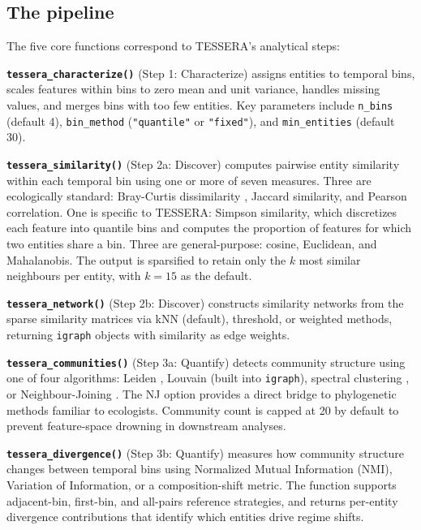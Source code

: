 \documentclass[12pt]{article}
\begin{document}
\subsection{The pipeline}

The five core functions correspond to TESSERA's analytical steps:

\textbf{\texttt{tessera\_characterize()}} (Step 1: Characterize) assigns entities to temporal bins, scales features within bins to zero mean and unit variance, handles missing values, and merges bins with too few entities. Key parameters include \texttt{n\_bins} (default 4), \texttt{bin\_method} (\texttt{"quantile"} or \texttt{"fixed"}), and \texttt{min\_entities} (default 30).

\textbf{\texttt{tessera\_similarity()}} (Step 2a: Discover) computes pairwise entity similarity within each temporal bin using one or more of seven measures. Three are ecologically standard: Bray-Curtis dissimilarity \citep[via \texttt{vegan};][]{Oksanen2022}, Jaccard similarity, and Pearson correlation. One is specific to TESSERA: Simpson similarity, which discretizes each feature into quantile bins and computes the proportion of features for which two entities share a bin. Three are general-purpose: cosine, Euclidean, and Mahalanobis. The output is sparsified to retain only the $k$ most similar neighbours per entity, with $k=15$ as the default.

\textbf{\texttt{tessera\_network()}} (Step 2b: Discover) constructs similarity networks from the sparse similarity matrices via kNN (default), threshold, or weighted methods, returning \texttt{igraph} objects \citep{Csardi2006} with similarity as edge weights.

\textbf{\texttt{tessera\_communities()}} (Step 3a: Quantify) detects community structure using one of four algorithms: Leiden \citep[via the \texttt{leiden} package;][]{Traag2019}, Louvain (built into \texttt{igraph}), spectral clustering \citep[via \texttt{kernlab};][]{Karatzoglou2004}, or Neighbour-Joining \citep[via \texttt{ape};][]{Paradis2019}. The NJ option provides a direct bridge to phylogenetic methods familiar to ecologists. Community count is capped at 20 by default to prevent feature-space drowning in downstream analyses.

\textbf{\texttt{tessera\_divergence()}} (Step 3b: Quantify) measures how community structure changes between temporal bins using Normalized Mutual Information (NMI), Variation of Information, or a composition-shift metric. The function supports adjacent-bin, first-bin, and all-pairs reference strategies, and returns per-entity divergence contributions that identify which entities drive regime shifts.
\end{document}
